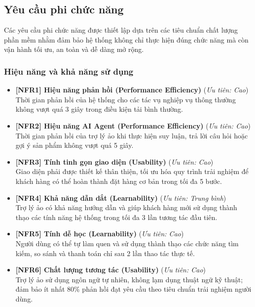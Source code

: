 \subsection{Yêu cầu phi chức năng}

Các yêu cầu phi chức năng được thiết lập dựa trên các tiêu chuẩn chất lượng phần mềm nhằm đảm bảo hệ thống không chỉ thực hiện đúng chức năng mà còn vận hành tối ưu, an toàn và dễ dàng mở rộng.

\subsubsection{Hiệu năng và khả năng sử dụng}

\begin{itemize}
    \item \textbf{[NFR1] Hiệu năng phản hồi (Performance Efficiency)} \hfill (\textit{Ưu tiên: Cao})\\
    Thời gian phản hồi của hệ thống cho các tác vụ nghiệp vụ thông thường không vượt quá 3 giây trong điều kiện tải bình thường.

    \item \textbf{[NFR2] Hiệu năng AI Agent (Performance Efficiency)} \hfill (\textit{Ưu tiên: Cao})\\
    Thời gian phản hồi của trợ lý ảo khi thực hiện suy luận, trả lời câu hỏi hoặc gợi ý sản phẩm không vượt quá 5 giây.

    \item \textbf{[NFR3] Tính tinh gọn giao diện (Usability)} \hfill (\textit{Ưu tiên: Cao})\\
    Giao diện phải được thiết kế thân thiện, tối ưu hóa quy trình trải nghiệm để khách hàng có thể hoàn thành đặt hàng cơ bản trong tối đa 5 bước.

    \item \textbf{[NFR4] Khả năng dẫn dắt (Learnability)} \hfill (\textit{Ưu tiên: Trung bình})\\
    Trợ lý ảo có khả năng hướng dẫn và giúp khách hàng mới sử dụng thành thạo các tính năng hệ thống trong tối đa 3 lần tương tác đầu tiên.

    \item \textbf{[NFR5] Tính dễ học (Learnability)} \hfill (\textit{Ưu tiên: Cao})\\
    Người dùng có thể tự làm quen và sử dụng thành thạo các chức năng tìm kiếm, so sánh và thanh toán chỉ sau 2 lần thao tác thực tế.

    \item \textbf{[NFR6] Chất lượng tương tác (Usability)} \hfill (\textit{Ưu tiên: Cao})\\
    Trợ lý ảo sử dụng ngôn ngữ tự nhiên, không lạm dụng thuật ngữ kỹ thuật; đảm bảo ít nhất 80\% phản hồi đạt yêu cầu theo tiêu chuẩn trải nghiệm người dùng.
\end{itemize}

